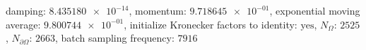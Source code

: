 damping: $\num[scientific-notation=true]{8.435180e-14}$, momentum: $\num[scientific-notation=true]{9.718645e-01}$, exponential moving average: $\num[scientific-notation=true]{9.800744e-01}$, initialize Kronecker factors to identity: $\text{yes}$, $N_{\Omega}$: $\num[scientific-notation=false]{2525}$, $N_{\partial\Omega}$: $\num[scientific-notation=false]{2663}$, batch sampling frequency: $\num[scientific-notation=false]{7916}$